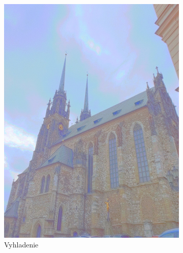 \begin{figure}[h!]
  \centering
  \begin{subfigure}{0.3\textwidth}
      \includegraphics[width=\textwidth]{figures/tests/tmo/durSpace1}
      \caption{Vyhladenie}
  \end{subfigure}
  ~
  \begin{subfigure}{0.3\textwidth}

\end{subfigure}
\end{figure}
